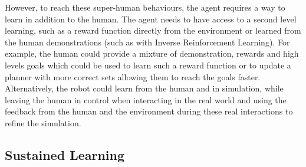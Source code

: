 


However, to reach these super-human behaviours, the agent requires a way to learn in addition to the human. The agent needs to have access to a second level learning, such as a reward function directly from the environment or learned from the human demonstrations (such as with Inverse Reinforcement Learning). For example, the human could provide a mixture of demonstration, rewards and high levels goals which could be used to learn such a reward function or to update a planner with more correct sets allowing them to reach the goals faster. Alternatively, the robot could learn from the human and in simulation, while leaving the human in control when interacting in the real world and using the feedback from the human and the environment during these real interactions to refine the simulation.

\subsection{Sustained Learning}

